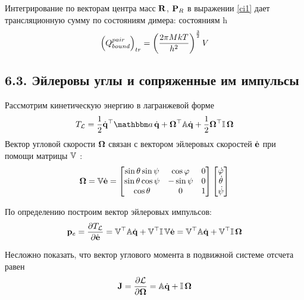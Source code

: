 Интегрирование по векторам центра масс $\mathbf{R}$, $\mathbf{P}_R$ в выражении \eqref{ci1} дает трансляционную сумму по состояниям димера:
 состояниям h
\begin{gather}
	\left( Q_{bound}^{pair} \right)_{tr} = \left( \frac{2 \pi M k T}{h^2} \right)^{\frac{3}{2}} V \notag
\end{gather}

\subsection*{\textbf{6.3.} Эйлеровы углы и сопряженные им импульсы}

Рассмотрим кинетическую энергию в лагранжевой форме
\vverh
\begin{gather}
	T_\mL = \frac{1}{2} \dot{\mf{q}}^\top \bba \, \dot{\mf{q}} + \mf{\Omega}^\top \bbA \dot{\mf{q}} + \frac{1}{2} \mf{\Omega}^\top \bbI \, \mf{\Omega} \notag
\end{gather}
Вектор угловой скорости $\mathbf{\Omega}$ связан с вектором эйлеровых скоростей $\dot{\mathbf{e}}$ при помощи матрицы $\mathbb{V}$ \cite{goldstein}:
\begin{gather}
\mathbf{\Omega} = \mathbb{V} \dot{\mathbf{e}} = 
\begin{bmatrix}
\sin \theta \sin \psi & \cos \varphi & 0 \\
\sin \theta \cos \psi & - \sin \psi & 0 \\
\cos \theta & 0 & 1
\end{bmatrix}
\begin{bmatrix}
\dot{\varphi} \\
\dot{\theta} \\
\dot{\psi}
\end{bmatrix} \notag 
\end{gather}

По определению построим вектор эйлеровых импульсов:
\vverh
\begin{gather}
	\mathbf{p}_e = \frac{\partial T_{\mathcal{L}}}{\partial \dot{\mathbf{e}}} = \mathbb{V}^\top \mathbb{A} \dot{\mathbf{q}} + \mathbb{V}^\top \mathbb{I} \, \mathbb{V} \dot{\mathbf{e}} = \mathbb{V}^\top \mathbb{A} \dot{\mathbf{q}} + \mathbb{V}^\top \mathbb{I} \, \mathbf{\Omega} \notag
\end{gather}

Несложно показать, что вектор углового момента в подвижной системе отсчета равен
\vverh
\begin{gather}
	\mathbf{J} = \frac{\partial \mathcal{L}}{\partial \mathbf{\Omega}} = \mathbb{A} \dot{\mathbf{q}} + \mathbb{I} \, \mathbf{\Omega} \notag
\end{gather}

